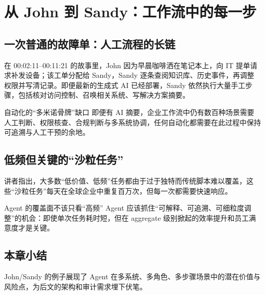 \section{从 John 到 Sandy：工作流中的每一步}
\subsection{一次普通的故障单：人工流程的长链}
在 00:02:11--00:11:21 的故事里，John 因为早晨咖啡洒在笔记本上，向 IT 提单请求补发设备；该工单分配给 Sandy，Sandy 逐条查阅知识库、历史事件，再调整权限并写清记录。即便最新的生成式 AI 已经部署，Sandy 依然执行大量手工步骤，包括核对访问控制、召唤相关系统、写解决方案摘要。

\begin{warningbox}{自动化的“多米诺骨牌”缺口}
即便有 AI 摘要，企业工作流中仍有数百种场景需要人工判断、权限核查、合规判断与多系统协调，任何自动化都需要在此过程中保持可追溯与人工干预的余地。
\end{warningbox}

\subsection{低频但关键的“沙粒任务”}
讲者指出，大多数“低价值、低频”任务都由于过于独特而传统脚本难以覆盖，这些“沙粒任务”每天在全球企业中重复百万次，但每一次都需要快速响应。

\begin{importantbox}{Agent 的覆盖面不该只看“高频”
}
Agent 应该抓住“可解释、可追溯、可细粒度调整”的机会：即使单次任务耗时短，但在 aggregate 级别掀起的效率提升和员工满意度才是关键。
\end{importantbox}

\subsection{本章小结}
John/Sandy 的例子展现了 Agent 在多系统、多角色、多步骤场景中的潜在价值与风险点，为后文的架构和审计需求埋下伏笔。

